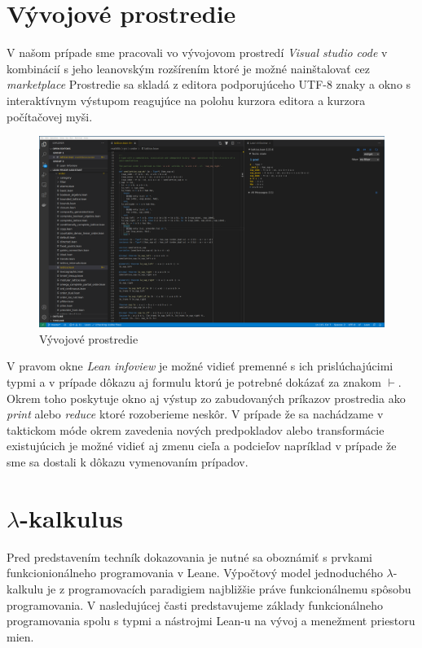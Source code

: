 \documentclass[a4paper,10pt,oneside]{report}%
\begin{document}
\section{Vývojové prostredie}
    V našom prípade sme pracovali vo vývojovom prostredí \emph{Visual studio code}
v kombinácií s jeho leanovským rozšírením ktoré je možné nainštalovať cez
\emph{marketplace} Prostredie sa skladá z editora podporujúceho UTF-8 znaky a okno
s interaktívnym výstupom reagujúce na polohu kurzora editora a kurzora počítačovej
myši.
\begin{center}
    \begin{figure}[!ht]
        \centering
        \includegraphics[scale=0.25]{vscode_printscreen.png}
        \caption{Vývojové prostredie}
    \end{figure}
\end{center}
    V pravom okne \emph{Lean infoview} je možné vidieť premenné s ich prislúchajúcimi
typmi a v prípade dôkazu aj formulu ktorú je potrebné dokázať za znakom $\vdash$.
    Okrem toho poskytuje okno aj výstup zo zabudovaných príkazov prostredia
ako \emph{print} alebo \emph{reduce} ktoré rozoberieme neskôr.
    V prípade že sa nachádzame v taktickom móde okrem zavedenia nových predpokladov
alebo transformácie existujúcich je možné vidieť aj zmenu cieľa a podcieľov
napríklad v prípade že sme sa dostali k dôkazu vymenovaním prípadov.
\section{$\lambda$-kalkulus}
    Pred predstavením techník dokazovania je nutné sa oboznámiť s prvkami funkcionionálneho
programovania v Leane.
    Výpočtový model jednoduchého $\lambda$-kalkulu je z programovacích paradigiem najbližšie práve funkcionálnemu spôsobu programovania.
V nasledujúcej časti predstavujeme základy funkcionálneho programovania spolu
    s typmi a nástrojmi Lean-u na vývoj a menežment priestoru mien.
\end{document}
